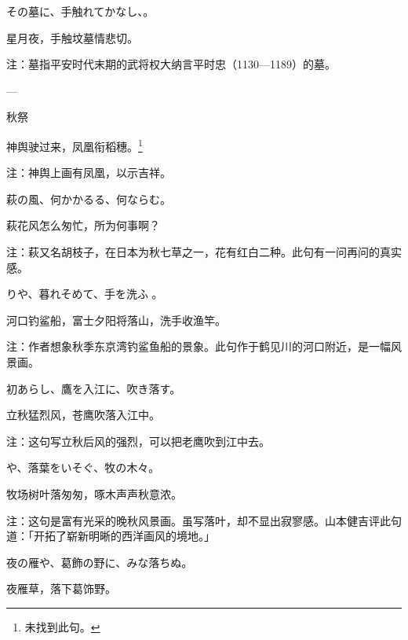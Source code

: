\begin{haiku}
    {\FH その墓に、手触れてかなし、。}

    {\FK 星月夜，手触坟墓情悲切。}

    {\FT 注：墓指平安时代末期的武将权大纳言平时忠（1130—1189）的墓。}
\end{haiku}

\begin{haiku}
    {\FH ---}

    {\FK 秋祭}

    {\FK 神舆驶过来，凤凰衔稻穗。\footnote{\FT 未找到此句。}}

    {\FT 注：神舆上画有凤凰，以示吉祥。}
\end{haiku}

\begin{haiku}
    {\FH 萩の風、何かかるる、何ならむ。}

    {\FK 萩花风怎么匆忙，所为何事啊？}

    {\FT 注：萩又名胡枝子，在日本为秋七草之一，花有红白二种。此句有一问再问的真实感。}
\end{haiku}

\begin{haiku}
    {\FH {}りや、暮れそめて、手を洗ふ 。}

    {\FK 河口钓鲨船，富士夕阳将落山，洗手收渔竿。}

    {\FT 注：作者想象秋季东京湾钓鲨鱼船的景象。此句作于鹤见川的河口附近，是一幅风景画。}
\end{haiku}

\begin{haiku}
    {\FH 初あらし、鷹を入江に、吹き落す。}

    {\FK 立秋猛烈风，苍鹰吹落入江中。}

    {\FT 注：这句写立秋后风的强烈，可以把老鹰吹到江中去。}
\end{haiku}

\begin{haiku}
    {\FH {}や、落葉をいそぐ、牧の木々。}

    {\FK 牧场树叶落匆匆，啄木声声秋意浓。}

    {\FT 注：这句是富有光采的晚秋风景画。虽写落叶，却不显出寂寥感。山本健吉评此句道：「开拓了崭新明晰的西洋画风的境地。」}
\end{haiku}

\begin{haiku}
    {\FH 夜の雁や、葛飾の野に、みな落ちぬ。}

    {\FK 夜雁草，落下葛饰野。}
\end{haiku}

